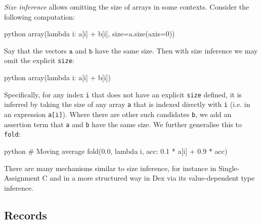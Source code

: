 \textit{Size inference} allows omitting the size of arrays in some contexts. Consider the following computation:
\begin{center} 
\begin{cminted}{python}
array(lambda i: a[i] + b[i], size=a.size(axis=0))
\end{cminted} 
\end{center}
Say that the vectors $\texttt{a}$ and $\texttt{b}$ have the same size. Then with size inference we may omit the explicit \texttt{size}:
\begin{center} 
\begin{cminted}{python}
array(lambda i: a[i] + b[i])
\end{cminted} 
\end{center}
Specifically, for any index \texttt{i} that does not have an explicit \texttt{size} defined, it is inferred by taking the size of any array \texttt{a} that is indexed directly with \texttt{i} (i.e. in an expression \texttt{a[i]}). 
Where there are other such candidates \texttt{b}, we add an assertion term that \texttt{a} and \texttt{b} have the same size. We further generalise this to \texttt{fold}:
\begin{center}
\begin{cminted}{python}
# Moving average
fold(0.0, lambda i, acc: 0.1 * a[i] + 0.9 * acc)
\end{cminted}
\end{center}


There are many mechanisms similar to size inference, for instance in Single-Assignment C and in a more structured way in Dex via its value-dependent type inference. 

\subsection{Records}

